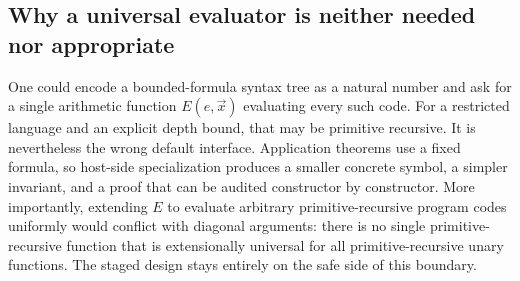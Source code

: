 \subsection{Why a universal evaluator is neither needed nor appropriate}

One could encode a bounded-formula syntax tree as a natural number and ask for a single arithmetic function
\(E(e,\vec x)\) evaluating every such code.  For a restricted language and an explicit depth bound, that
may be primitive recursive.  It is nevertheless the wrong default interface.  Application theorems use a
fixed formula, so host-side specialization produces a smaller concrete symbol, a simpler invariant, and a
proof that can be audited constructor by constructor.  More importantly, extending \(E\) to evaluate
arbitrary primitive-recursive program codes uniformly would conflict with diagonal arguments: there is no
single primitive-recursive function that is extensionally universal for all primitive-recursive unary
functions.  The staged design stays entirely on the safe side of this boundary.
